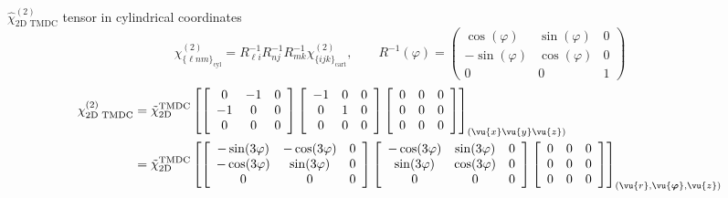 \documentclass[
aspectratio=169,
16pt,
xcolor={dvipsnames} %
]{beamer}
\begin{document}
\begin{frame}{$\hat{\chi}^{(2)}_{\text{2D TMDC}}$ tensor in cylindrical coordinates}
	\begin{equation*}
		\chi^{(2)}_{\{\ell n m\}_{\text{cyl}}} = R^{-1}_{\ell i} R^{-1}_{n j} R^{-1}_{m k} \chi^{(2)}_{\{ijk\}_{\text{cart}}}, \qquad R^{-1}(\varphi) = \begin{pmatrix}
			\cos(\varphi) & \sin(\varphi) & 0 \\
			-\sin(\varphi) & \cos(\varphi) & 0 \\
			0 & 0  & 1
		\end{pmatrix}
	\end{equation*}
	{\tiny\begin{align*}
			\chi^{(2)}_{\text{2D TMDC}}  = \tilde{\chi}^{\text{TMDC}}_{\text{2D}}
			&\left[\left[\begin{array}{ccc}
				0 & -1 & 0 \\
				-1 & 0 & 0 \\
				0 & 0 & 0
			\end{array}\right]\left[\begin{array}{ccc}
				-1 & 0 & 0 \\
				0 & 1 & 0 \\
				0 & 0 & 0
			\end{array}\right]\left[\begin{array}{lll}
				0 & 0 & 0 \\
				0 & 0 & 0 \\
				0 & 0 & 0
			\end{array}\right]\right]_{(\vu{x}\vu{y}\vu{z})}
			\\ = \tilde{\chi}^{\text{TMDC}}_{\text{2D}}
			&\left[\left[\begin{array}{ccc}
				-\sin (3 \varphi) & -\cos (3 \varphi) & 0 \\
				-\cos (3 \varphi) & \sin (3 \varphi) & 0 \\
				0 & 0 & 0
			\end{array}\right]\left[\begin{array}{ccc}
				-\cos (3 \varphi) & \sin (3 \varphi) & 0 \\
				\sin (3 \varphi) & \cos (3 \varphi) & 0 \\
				0 & 0 & 0
			\end{array}\right]\left[\begin{array}{lll}
				0 & 0 & 0 \\
				0 & 0 & 0 \\
				0 & 0 & 0
			\end{array}\right]\right]_{(\vu{r},\vu{\boldsymbol{\varphi}}, \vu{z})}

\end{align*}}
\end{frame}
\end{document}
